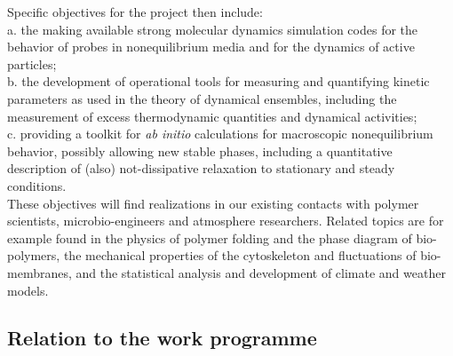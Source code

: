  Specific objectives for the project then include:\\
 a. the making available strong molecular dynamics simulation codes for the behavior of probes in nonequilibrium media and for the dynamics of active particles;\\
 b. the development of operational tools for measuring and quantifying kinetic parameters as used in the theory of dynamical ensembles, including the measurement of excess thermodynamic quantities and dynamical activities;\\
 c. providing a toolkit for {\it ab initio} calculations for macroscopic nonequilibrium behavior, possibly allowing new stable phases, including a quantitative description of (also) not-dissipative relaxation to stationary and steady conditions.\\
 These objectives will find realizations in our existing contacts with polymer scientists, microbio-engineers and atmosphere researchers.   Related topics are for example found in the physics of polymer folding and the phase diagram of bio-polymers, the mechanical properties of the cytoskeleton and fluctuations of bio-membranes, and the statistical analysis and development of climate and weather models.  

\subsection{Relation to the work programme}\label{sec:relation-wp}


